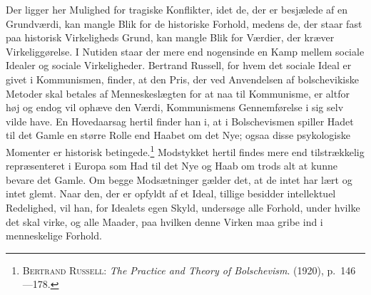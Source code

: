 \documentclass[12pt]{article}
\newcommand{\opage}[1]{\marginnote{\footnotesize\textit{[#1]}}}
\begin{document}
Der ligger her Mulighed for tragiske Konflikter, idet de, der er
besjælede af en Grundværdi, kan mangle Blik for de historiske Forhold,
medens de, der staar fast paa historisk Virkeligheds Grund, kan mangle
Blik for Værdier, der kræver Virkeliggørelse. I Nutiden staar der mere
end nogensinde en Kamp mellem sociale Idealer og sociale Virkeligheder.
Bertrand Russell, for hvem det sociale Ideal er givet i Kommunismen,
finder, at den Pris, der ved Anvendelsen af bolschevikiske Metoder skal
betales af Menneskeslægten for at naa til Kommunisme, er altfor høj og
endog vil ophæve den Værdi, Kommunismens Gennemførelse i sig selv vilde
have. En Hovedaarsag hertil finder han i, at i Bolschevismen spiller
Hadet til det Gamle en større Rolle end Haabet om det Nye; ogsaa disse
psykologiske Momenter er historisk betingede.\footnote{\textsc{Bertrand
Russell}: \textit{The Practice and Theory of Bolschevism}. (1920),
p.~146---178.}
Modstykket hertil findes mere end tilstrækkelig repræsenteret i Europa
som Had til det Nye og Haab om trods alt at kunne bevare det Gamle. Om
begge Modsætninger gælder det, at de intet har lært og intet glemt. Naar
den, der er opfyldt af et Ideal, tillige besidder intellektuel
Redelighed, vil han,
\opage{89} \setcounter{footnote}{0}
for Idealets egen Skyld, undersøge alle Forhold, under hvilke det skal
virke, og alle Maader, paa hvilken denne Virken maa gribe ind i
menneskelige Forhold.
\end{document}
